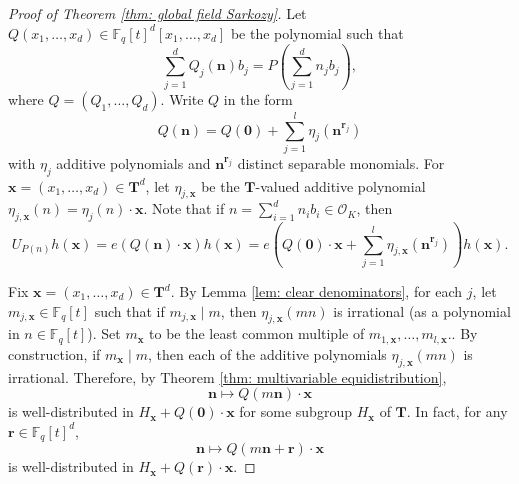 \documentclass{amsart}
\theoremstyle{definition}
\numberwithin{equation}{section}
\newcommand{\F}{\mathbb{F}}
\newcommand{\mO}{\mathcal{O}}
\begin{document}
\begin{proof}[Proof of Theorem \ref{thm: global field Sarkozy}]
    Let $Q(x_1, \ldots, x_d) \in \F_q[t]^d[x_1, \ldots, x_d]$ be the polynomial such that
    \begin{equation*}
        \sum_{j=1}^d Q_j(\bm{n})b_j = P \left( \sum_{j=1}^d n_j b_j \right),
    \end{equation*}
    where $Q = (Q_1, \ldots, Q_d)$.
    Write $Q$ in the form
    \begin{equation*}
        Q(\bm{n}) = Q(\bm{0}) + \sum_{j=1}^l \eta_j(\bm{n}^{\bm{r}_j})
    \end{equation*}
    with $\eta_j$ additive polynomials and $\bm{n}^{\bm{r}_j}$ distinct separable monomials.
    For $\bm{x} = (x_1, \ldots, x_d) \in \mathbf{T}^d$, let $\eta_{j,\bm{x}}$ be the $\mathbf{T}$-valued additive polynomial $\eta_{j,\bm{x}}(n) = \eta_{j}(n) \cdot\bm{x}$.
    Note that if $n = \sum_{i=1}^d n_i b_i \in \mO_K$, then
    \begin{equation*}
        U_{P(n)} h(\bm{x}) = e \left( Q(\bm{n}) \cdot \bm{x} \right) h(\bm{x})
         = e \left( Q(\bm{0}) \cdot \bm{x} + \sum_{j=1}^l \eta_{j,\bm{x}}(\bm{n}^{\bm{r}_j}) \right) h(\bm{x}).
    \end{equation*}

    Fix $\bm{x} = (x_1, \ldots, x_d) \in \mathbf{T}^d$.
    By Lemma \ref{lem: clear denominators}, for each $j$, let $m_{j,\bm{x}} \in \F_q[t]$ such that if $m_{j,\bm{x}} \mid m$, then $\eta_{j,\bm{x}}(mn)$ is irrational (as a polynomial in $n \in \F_q[t]$).
    Set $m_{\bm{x}}$ to be the least common multiple of $m_{1,\bm{x}}, \ldots, m_{l,\bm{x}}$..
    By construction, if $m_{\bm{x}} \mid m$, then each of the additive polynomials $\eta_{j,\bm{x}}(mn)$ is irrational.
    Therefore, by Theorem \ref{thm: multivariable equidistribution},
    \begin{equation*}
        \bm{n} \mapsto Q(m\bm{n}) \cdot \bm{x}
    \end{equation*}
    is well-distributed in $H_{\bm{x}} + Q(\bm{0}) \cdot \bm{x}$ for some subgroup $H_{\bm{x}}$ of $\mathbf{T}$.
    In fact, for any $\bm{r} \in \F_q[t]^d$,
    \begin{equation*}
        \bm{n} \mapsto Q(m\bm{n} + \bm{r}) \cdot \bm{x}
    \end{equation*}
    is well-distributed in $H_{\bm{x}} + Q(\bm{r}) \cdot \bm{x}$.
	

\end{proof}
\end{document}
